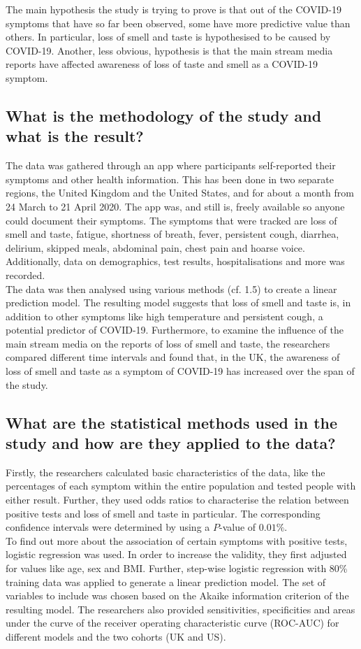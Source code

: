 \documentclass{article}
\begin{document}
The main hypothesis the study is trying to prove is that out of the COVID-19 symptoms that have
so far been observed, some have more predictive value than others. In particular, loss of smell
and taste is hypothesised to be caused by COVID-19. Another, less obvious, hypothesis is
that the main stream media reports have affected awareness of loss of taste and
smell as a COVID-19 symptom.

\subsection{What is the methodology of the study and what is the result?}

The data was gathered through an app where participants self-reported their symptoms and other
health information. This has been done in two separate regions, the United Kingdom and the United
States, and for about a month from 24 March to 21 April 2020.
The app was, and still is, freely available so anyone could document their symptoms.
The symptoms that were tracked are loss of smell
and taste, fatigue, shortness of breath, fever, persistent cough, diarrhea, delirium, skipped meals,
abdominal pain, chest pain and hoarse voice. Additionally, data on demographics,
test results, hospitalisations and more was recorded.\\
\indent The data was then analysed using various methods (cf. 1.5) to create a linear
prediction model. The resulting model suggests that loss of smell and taste is, in
addition to other symptoms like high temperature and persistent cough, a
potential predictor of COVID-19. Furthermore, to examine the influence of the main
stream media on the reports of loss of smell and taste, the researchers compared
different time intervals and found that, in the UK, the awareness of loss of smell
and taste as a symptom of COVID-19 has increased over the span of the study.

\subsection{What are the statistical methods used in the study and how are they applied to the data?}

Firstly, the researchers calculated basic characteristics of the data, like the percentages
of each symptom within the entire population and tested people with either result. Further,
they used odds ratios to characterise the relation between positive tests and loss of
smell and taste in particular. The corresponding confidence intervals were determined by
using a $P$-value of $0.01\%$.\\
\indent To find out more about the association of certain symptoms with positive tests, logistic
regression was used. In order to increase the validity,
they first adjusted for values like age, sex and BMI. Further, step-wise logistic regression
with 80\% training data was applied to generate
a linear prediction model. The set of variables to include was
chosen based on the Akaike information criterion of the resulting model. The researchers also
provided sensitivities, specificities and areas under the curve of the receiver operating
characteristic curve (ROC-AUC) for different models and the two cohorts (UK and US).
\end{document}
